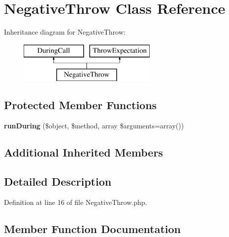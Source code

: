 \section{Negative\+Throw Class Reference}
\label{class_php_spec_1_1_wrapper_1_1_subject_1_1_expectation_1_1_negative_throw}
Inheritance diagram for Negative\+Throw\+:\begin{figure}[H]
\begin{center}
\leavevmode
\includegraphics[height=2.000000cm]{class_php_spec_1_1_wrapper_1_1_subject_1_1_expectation_1_1_negative_throw}
\end{center}
\end{figure}
\subsection*{Protected Member Functions}
\begin{DoxyCompactItemize}
\item 
{\bf run\+During} (\$object, \$method, array \$arguments=array())
\end{DoxyCompactItemize}
\subsection*{Additional Inherited Members}


\subsection{Detailed Description}


Definition at line 16 of file Negative\+Throw.\+php.



\subsection{Member Function Documentation}

